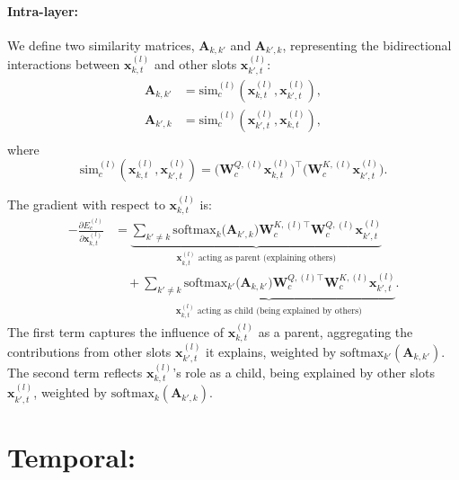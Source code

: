 \documentclass{article}
\begin{document}
\paragraph{Intra-layer:}

We define two similarity matrices, \(\bm{A}_{k,k'}\) and \(\bm{A}_{k',k}\), representing the bidirectional interactions between \(\bm{x}_{k,t}^{(l)}\) and other slots \(\bm{x}_{k',t}^{(l)}\):
\begin{equation}
\begin{aligned}
\bm{A}_{k,k'} &= \mathrm{sim}_{c}^{(l)}(\bm{x}_{k,t}^{(l)}, \bm{x}_{k',t}^{(l)}), \\
\bm{A}_{k',k} &= \mathrm{sim}_{c}^{(l)}(\bm{x}_{k',t}^{(l)}, \bm{x}_{k,t}^{(l)}), \\
\end{aligned}
\end{equation}
where 
\[
\mathrm{sim}_{c}^{(l)}(\bm{x}_{k,t}^{(l)}, \bm{x}_{k',t}^{(l)}) 
= \bigl(\bm{W}_{c}^{Q,(l)} \bm{x}_{k,t}^{(l)}\bigr)^\top \bigl(\bm{W}_{c}^{K,(l)} \bm{x}_{k',t}^{(l)}\bigr).
\]

The gradient with respect to \(\bm{x}_{k,t}^{(l)}\) is:
\begin{equation}
\begin{aligned}
-\frac{\partial E_{c}^{(l)}}{\partial \bm{x}_{k,t}^{(l)}}
&=
\underbrace{
\sum_{k'\neq k}
\mathrm{softmax}_{k}\bigl(\bm{A}_{k',k}\bigr)
\bm{W}_{c}^{K,(l)\top} \bm{W}_{c}^{Q,(l)} \bm{x}_{k',t}^{(l)}
}_{\text{\(\bm{x}_{k,t}^{(l)}\) acting as parent (explaining others)}} 
\\
&\quad +
\underbrace{
\sum_{k'\neq k}
\mathrm{softmax}_{k'}\bigl(\bm{A}_{k, k'}\bigr)
\bm{W}_{c}^{Q,(l)\top} \bm{W}_{c}^{K,(l)} \bm{x}_{k',t}^{(l)}
}_{\text{\(\bm{x}_{k,t}^{(l)}\) acting as child (being explained by others)}}.
\end{aligned}
\end{equation}
The first term captures the influence of \(\bm{x}_{k,t}^{(l)}\) as a parent, aggregating the contributions from other slots \(\bm{x}_{k',t}^{(l)}\) it explains, weighted by \(\mathrm{softmax}_{k'}(\bm{A}_{k,k'})\). The second term reflects \(\bm{x}_{k,t}^{(l)}\)'s role as a child, being explained by other slots \(\bm{x}_{k',t}^{(l)}\), weighted by \(\mathrm{softmax}_{k}(\bm{A}_{k',k})\).




    

\section{Temporal:}
\end{document}
